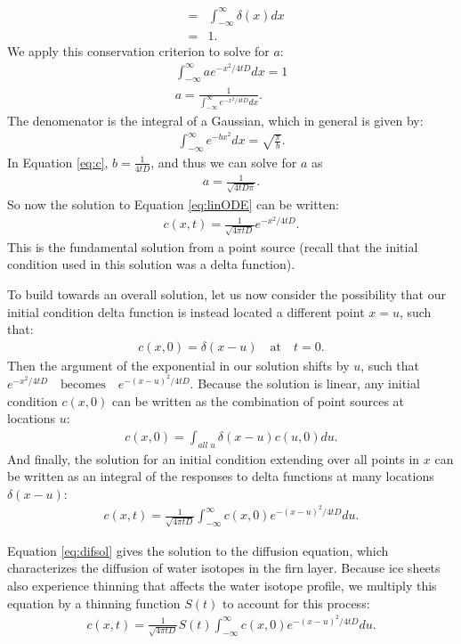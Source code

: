 \documentclass[draft, jgrga]{AGUTeX}
\begin{document}
\begin{article}
\begin{eqnarray}
& = & \int^\infty_{-\infty} \delta (x) dx \nonumber \\
& = & 1. \nonumber
\end{eqnarray}
We apply this conservation criterion to solve for $a$:
\begin{eqnarray}
\int^\infty_{-\infty} a e^{-x^2/4tD} dx = 1 \\
a = \frac{1}{\int^\infty_{-\infty} e^{-x^2/4tD} dx}. \label{eq:c}
\end{eqnarray}
The denomenator is the integral of a Gaussian, which in general is given by:
\begin{eqnarray}
\int^\infty_{-\infty} e^{-bx^2} dx = \sqrt{\frac{\pi}{b}}. \nonumber
\end{eqnarray}
In Equation \ref{eq:c}, $b = \frac{1}{4tD}$, and thus we can solve for $a$ as
\begin{eqnarray}
a = \frac{1}{\sqrt{4tD \pi}}.
\end{eqnarray}
So now the solution to Equation \ref{eq:linODE} can be written:
\begin{eqnarray}
c(x,t) = \frac{1}{\sqrt{4 \pi tD}} e^{-x^2/4tD}.
\end{eqnarray}
This is the fundamental solution from a point source (recall that the initial condition used in this solution was a delta function).

To build towards an overall solution, let us now consider the possibility that our initial condition delta function is instead located a different point $x = u$, such that:
\begin{eqnarray}
c(x,0) = \delta (x-u) \quad \mbox{at} \quad t=0. \nonumber
\end{eqnarray}
Then the argument of the exponential in our solution shifts by $u$, such that $e^{-x^2/4tD} \quad \mbox{becomes} \quad e^{-(x-u)^2/4tD}.$
Because the solution is linear, any initial condition $c(x,0)$ can be written as the combination of point sources at locations $u$:
\begin{eqnarray}
c(x,0) = \int_{all \; u} \delta (x-u) c(u,0) du.
\end{eqnarray}
And finally, the solution for an initial condition extending over all points in $x$ can be written as an integral of the responses to delta functions at many locations $\delta(x-u)$:
\begin{eqnarray}
  \label{eq:difsol}
c(x,t) = \frac{1}{\sqrt{4 \pi tD}} \int^{\infty}_{-\infty} c(x,0)
e^{-(x-u)^2/4tD} du.
\end{eqnarray}

Equation \ref{eq:difsol} gives the solution to the diffusion equation, which characterizes the diffusion of water isotopes in the firn layer. Because ice sheets also experience thinning that affects the water isotope profile, we multiply this equation by a thinning function $S(t)$ to account for this process:
\begin{eqnarray}
  \label{eq:isoprofile}
c(x,t) = \frac{1}{\sqrt{4 \pi tD}} S(t) \int^{\infty}_{-\infty} c(x,0)
e^{-(x-u)^2/4tD} du.
\end{eqnarray}


\end{article}
\end{document}
